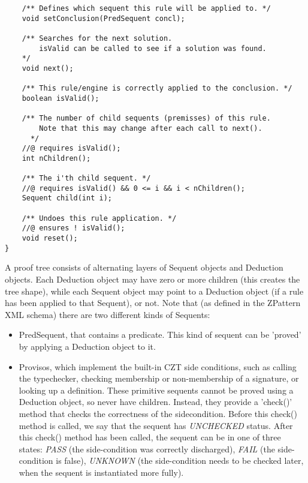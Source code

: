 \documentclass{article}
\begin{document}
\begin{enumerate}
\begin{verbatim}
    /** Defines which sequent this rule will be applied to. */
    void setConclusion(PredSequent concl);

    /** Searches for the next solution.
        isValid can be called to see if a solution was found.
    */
    void next();

    /** This rule/engine is correctly applied to the conclusion. */
    boolean isValid();

    /** The number of child sequents (premisses) of this rule.
        Note that this may change after each call to next().
      */
    //@ requires isValid();
    int nChildren();

    /** The i'th child sequent. */
    //@ requires isValid() && 0 <= i && i < nChildren();
    Sequent child(int i);

    /** Undoes this rule application. */
    //@ ensures ! isValid();
    void reset();
}
\end{verbatim}

  A proof tree consists of alternating layers of Sequent objects
  and Deduction objects.  Each Deduction object may have zero or more
  children (this creates the tree shape), while each Sequent object
  may point to a Deduction object (if a rule has been applied to that Sequent),
  or not.  Note that (as defined in the ZPattern XML schema) there
  are two different kinds of Sequents:
  \begin{itemize}
  \item PredSequent, that contains a predicate.  This kind of sequent
    can be 'proved' by applying a Deduction object to it.
    
  \item Provisos, which implement the built-in CZT side conditions,
    such as calling the typechecker, checking membership or non-membership
    of a signature, or looking up a definition.  These primitive
    sequents cannot be proved using a Deduction object, so never have
    children.  Instead, they provide a 'check()' method that checks
    the correctness of the sidecondition.  Before this check() method
    is called, we say that the sequent has \emph{UNCHECKED} status.
    After this check() method
    has been called, the sequent can be in one of three states:
    \emph{PASS} (the side-condition was correctly discharged),
    \emph{FAIL} (the side-condition is false),
    \emph{UNKNOWN} (the side-condition needs to be checked later,
    when the sequent is instantiated more fully). 
  \end{itemize}


\end{enumerate}
\end{document}
